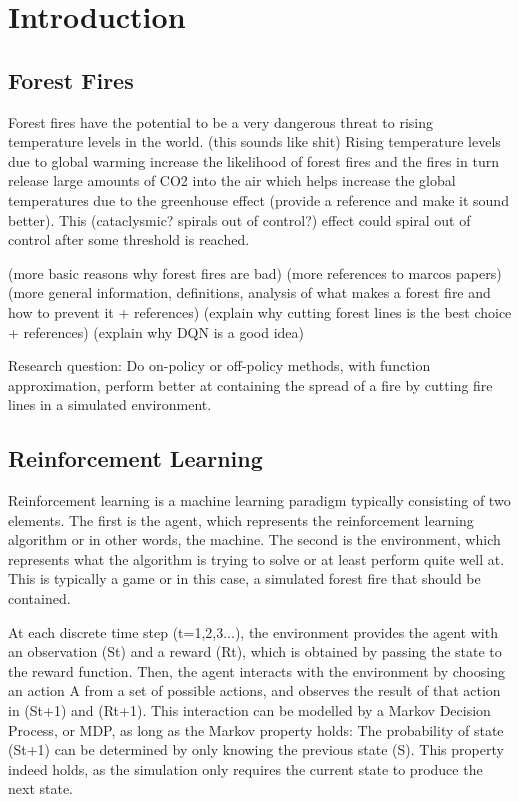 \section{Introduction}\label{sec:introduction}

\subsection{Forest Fires}
Forest fires have the potential to be a very dangerous threat to rising temperature levels in the world. (this sounds like shit) Rising temperature levels due to global warming increase the likelihood of forest fires and the fires in turn release large amounts of CO2 into the air which helps increase the global temperatures due to the greenhouse effect (provide a reference and make it sound better). This (cataclysmic? spirals out of control?) effect could spiral out of control after some threshold is reached.

(more basic reasons why forest fires are bad)
(more references to marcos papers)
(more general information, definitions, analysis of what makes a forest fire and how to prevent it + references)
(explain why cutting forest lines is the best choice + references)
(explain why DQN is a good idea)

Research question: Do on-policy or off-policy methods, with function approximation, perform better at containing the spread of a fire by cutting fire lines in a simulated environment.

\subsection{Reinforcement Learning}\label{sec:reinforcementlearning}
Reinforcement learning is a machine learning paradigm typically consisting of two elements. The first is the agent, which represents the reinforcement learning algorithm or in other words, the machine. The second is the environment, which represents what the algorithm is trying to solve or at least perform quite well at. This is typically a game or in this case, a simulated forest fire that should be contained.

At each discrete time step (t=1,2,3...), the environment provides the agent with an observation (St) and a reward (Rt), which is obtained by passing the state to the reward function. Then, the agent interacts with the environment by choosing an action A from a set of possible actions, and observes the result of that action in (St+1) and (Rt+1). This interaction can be modelled by a Markov Decision Process, or MDP, as long as the Markov property holds: The probability of state (St+1) can be determined by only knowing the previous state (S). This property indeed holds, as the simulation only requires the current state to produce the next state.

